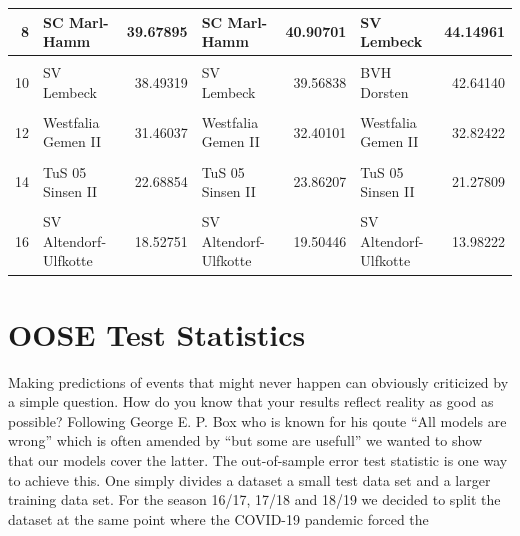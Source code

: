 \documentclass[12pt,a4paper]{article}
\begin{document}
\begin{table}[H]
{\begin{tabular}[t]{r|l|r|l|r|l|r}
\hline
8 & SC Marl-Hamm & 39.67895 & SC Marl-Hamm & 40.90701 & SV Lembeck & 44.14961\\
\hline
\cellcolor{gray!6}{9} & \cellcolor{gray!6}{BVH Dorsten} & \cellcolor{gray!6}{38.56991} & \cellcolor{gray!6}{BVH Dorsten} & \cellcolor{gray!6}{39.89500} & \cellcolor{gray!6}{SC Marl-Hamm} & \cellcolor{gray!6}{43.87890}\\
\hline
10 & SV Lembeck & 38.49319 & SV Lembeck & 39.56838 & BVH Dorsten & 42.64140\\
\hline
\cellcolor{gray!6}{11} & \cellcolor{gray!6}{FC RW Dorsten} & \cellcolor{gray!6}{34.61080} & \cellcolor{gray!6}{FC RW Dorsten} & \cellcolor{gray!6}{35.82449} & \cellcolor{gray!6}{FC RW Dorsten} & \cellcolor{gray!6}{37.59242}\\
\hline
12 & Westfalia Gemen II & 31.46037 & Westfalia Gemen II & 32.40101 & Westfalia Gemen II & 32.82422\\
\hline
\cellcolor{gray!6}{13} & \cellcolor{gray!6}{SC Reken II} & \cellcolor{gray!6}{27.79455} & \cellcolor{gray!6}{SC Reken II} & \cellcolor{gray!6}{29.11275} & \cellcolor{gray!6}{SC Reken II} & \cellcolor{gray!6}{27.60483}\\
\hline
14 & TuS 05 Sinsen II & 22.68854 & TuS 05 Sinsen II & 23.86207 & TuS 05 Sinsen II & 21.27809\\
\hline
\cellcolor{gray!6}{15} & \cellcolor{gray!6}{Adler Weseke II} & \cellcolor{gray!6}{21.69107} & \cellcolor{gray!6}{Adler Weseke II} & \cellcolor{gray!6}{22.59512} & \cellcolor{gray!6}{Adler Weseke II} & \cellcolor{gray!6}{18.88125}\\
\hline
16 & SV Altendorf-Ulfkotte & 18.52751 & SV Altendorf-Ulfkotte & 19.50446 & SV Altendorf-Ulfkotte & 13.98222\\
\hline
\end{tabular}}
\end{table}

\hypertarget{oose-test-statistics}{%
\section{OOSE Test Statistics}\label{oose-test-statistics}}

Making predictions of events that might never happen can obviously
criticized by a simple question. How do you know that your results
reflect reality as good as possible? Following George E. P. Box who is
known for his qoute \enquote{All models are wrong} which is often
amended by \enquote{but some are usefull} we wanted to show that our
models cover the latter. The out-of-sample error test statistic is one
way to achieve this. One simply divides a dataset a small test data set
and a larger training data set. For the season 16/17, 17/18 and 18/19 we
decided to split the dataset at the same point where the COVID-19
pandemic forced the
\end{document}
